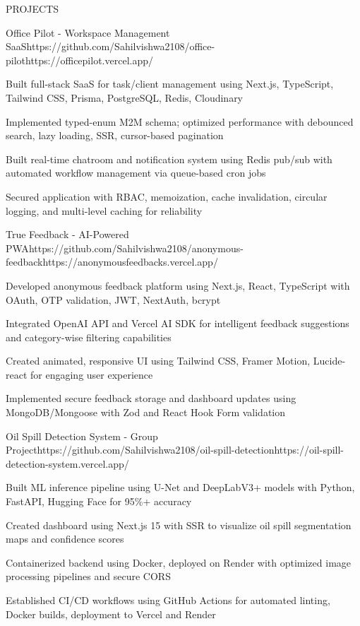 \documentclass{resume}
\begin{document}
\begin{rSection}{PROJECTS}

\begin{rProject}{Office Pilot - Workspace Management SaaS}{https://github.com/Sahilvishwa2108/office-pilot}{https://officepilot.vercel.app/}
\item Built full-stack SaaS for task/client management using Next.js, TypeScript, Tailwind CSS, Prisma, PostgreSQL, Redis, Cloudinary
\item Implemented typed-enum M2M schema; optimized performance with debounced search, lazy loading, SSR, cursor-based pagination
\item Built real-time chatroom and notification system using Redis pub/sub with automated workflow management via queue-based cron jobs
\item Secured application with RBAC, memoization, cache invalidation, circular logging, and multi-level caching for reliability
\end{rProject}

\begin{rProject}{True Feedback - AI-Powered PWA}{https://github.com/Sahilvishwa2108/anonymous-feedback}{https://anonymousfeedbacks.vercel.app/}
\item Developed anonymous feedback platform using Next.js, React, TypeScript with OAuth, OTP validation, JWT, NextAuth, bcrypt
\item Integrated OpenAI API and Vercel AI SDK for intelligent feedback suggestions and category-wise filtering capabilities
\item Created animated, responsive UI using Tailwind CSS, Framer Motion, Lucide-react for engaging user experience
\item Implemented secure feedback storage and dashboard updates using MongoDB/Mongoose with Zod and React Hook Form validation
\end{rProject}

\begin{rProject}{Oil Spill Detection System - Group Project}{https://github.com/Sahilvishwa2108/oil-spill-detection}{https://oil-spill-detection-system.vercel.app/}
\item Built ML inference pipeline using U-Net and DeepLabV3+ models with Python, FastAPI, Hugging Face for 95\%+ accuracy
\item Created dashboard using Next.js 15 with SSR to visualize oil spill segmentation maps and confidence scores
\item Containerized backend using Docker, deployed on Render with optimized image processing pipelines and secure CORS
\item Established CI/CD workflows using GitHub Actions for automated linting, Docker builds, deployment to Vercel and Render
\end{rProject}

\end{rSection}
\end{document}
